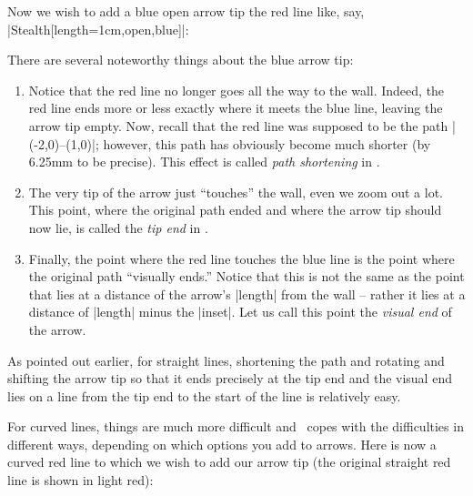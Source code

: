 Now we wish to add a blue open arrow tip the red line like, say, 
|Stealth[length=1cm,open,blue]|: 

\def\wall{ \fill     [fill=black!50]  (1,-.5) rectangle (2,.5);
           \pattern  [pattern=bricks] (1,-.5) rectangle (2,.5);
           \draw     [line width=1pt]  (1cm+.5pt,-.5) -- ++(0,1); }
\begin{codeexample}[]
\end{codeexample}

There are several noteworthy things about the blue arrow tip:
\begin{enumerate}
\item Notice that the red line no longer goes all the way to the
  wall. Indeed, the red line ends more or less exactly where it meets
  the blue line, leaving the arrow tip empty. Now, recall that the red
  line was supposed to be the path |(-2,0)--(1,0)|; however, this path
  has obviously become much shorter (by 6.25mm to be precise). This
  effect is called \emph{path shortening} in \tikzname.
\item The very tip of the arrow just ``touches'' the wall, even we
  zoom out a lot. This point, where the original path ended and where
  the arrow tip should now lie, is called the \emph{tip end} in
  \tikzname.
\item Finally, the point where the red line touches the blue line is
  the point where the original path ``visually ends.'' Notice that
  this is not the same as the point that lies at a distance of the
  arrow's |length| from the wall -- rather it lies at a distance of
  |length| minus the |inset|. Let us call this point the \emph{visual
    end} of the arrow.
\end{enumerate}

As pointed out earlier, for straight lines, shortening the path and
rotating and shifting the arrow tip so that it ends precisely at the
tip end and the visual end lies on a line from the tip end to the
start of the line is relatively easy.

For curved lines, things are much more difficult and \tikzname\ copes
with the difficulties in different ways, depending on which options
you add to arrows. Here is now a curved red line to which we wish to
add our arrow tip (the original straight red line is shown in light red):

